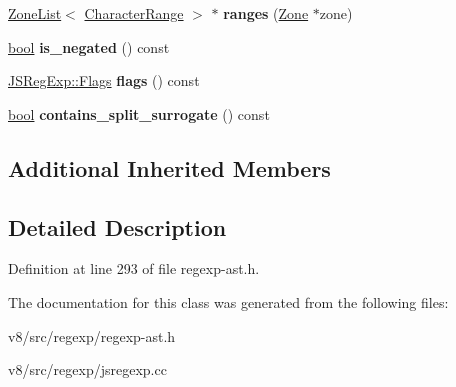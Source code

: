 \begin{DoxyCompactItemize}
\item 
\mbox{\label{classv8_1_1internal_1_1RegExpCharacterClass_a5ff03e7b8e528731216c7d8d4e26fe7a}} 
\mbox{\hyperlink{classv8_1_1internal_1_1ZoneList}{Zone\+List}}$<$ \mbox{\hyperlink{classv8_1_1internal_1_1CharacterRange}{Character\+Range}} $>$ $\ast$ {\bfseries ranges} (\mbox{\hyperlink{classv8_1_1internal_1_1Zone}{Zone}} $\ast$zone)
\item 
\mbox{\label{classv8_1_1internal_1_1RegExpCharacterClass_a8d270a839bd3bdaf2490c8e18830f792}} 
\mbox{\hyperlink{classbool}{bool}} {\bfseries is\+\_\+negated} () const
\item 
\mbox{\label{classv8_1_1internal_1_1RegExpCharacterClass_a9d1e27a72b26c7791b2b5ccc7d8bc79e}} 
\mbox{\hyperlink{classv8_1_1base_1_1Flags}{J\+S\+Reg\+Exp\+::\+Flags}} {\bfseries flags} () const
\item 
\mbox{\label{classv8_1_1internal_1_1RegExpCharacterClass_adf74924435a9dae6625232a7f7698f4e}} 
\mbox{\hyperlink{classbool}{bool}} {\bfseries contains\+\_\+split\+\_\+surrogate} () const
\end{DoxyCompactItemize}
\subsection*{Additional Inherited Members}


\subsection{Detailed Description}


Definition at line 293 of file regexp-\/ast.\+h.



The documentation for this class was generated from the following files\+:\begin{DoxyCompactItemize}
\item 
v8/src/regexp/regexp-\/ast.\+h\item 
v8/src/regexp/jsregexp.\+cc\end{DoxyCompactItemize}
